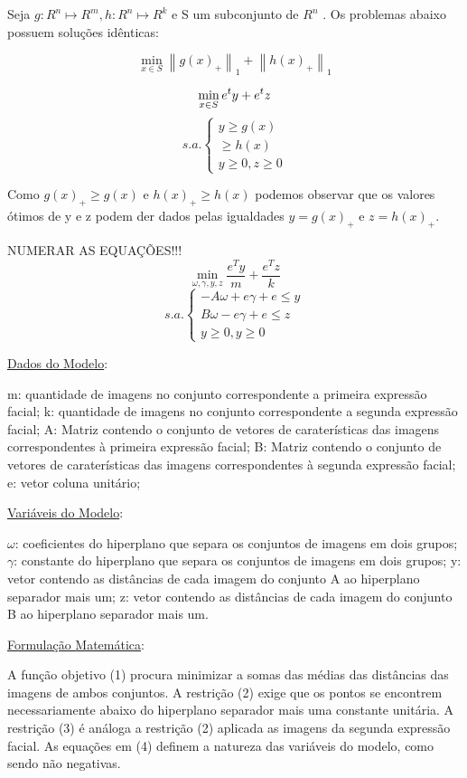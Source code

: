 Seja $g:R^{n} \mapsto R^{m} , h:R^{n} \mapsto R^{k}$ e S um subconjunto de $R^{n}$ . Os problemas abaixo possuem soluções idênticas:

$$\min_{x\in S}\left \| g(x)_{+} \right \|_{1} + \left \| h(x)_{+} \right \|_{1}$$


$$\min_{x\in S} e^{t}y + e^{t}z\\$$
$$ s.a.\left\{\begin{matrix}y\geq g(x)\\ \geq h(x)\\ y\geq 0, z\geq0\end{matrix}\right.$$

Como $g(x)_{+}\geq g(x)$ e $h(x)_{+}\geq h(x)$ podemos observar que os valores ótimos de y e z podem der dados pelas igualdades $y=g(x)_{+}$ e $z=h(x)_{+}$.

NUMERAR AS EQUAÇÕES!!!
$$\min_{\omega ,\gamma ,y,z}\frac{e^{T}y}{m}+\frac{e^{T}z}{k}$$
$$s.a.\left\{\begin{matrix}-A\omega +e\gamma+e\leq y\\B\omega -e\gamma+e\leq  z\\ y\geq 0,y\geq 0\end{matrix}\right.$$

\underline{Dados do Modelo}:

m: quantidade de imagens no conjunto correspondente a primeira expressão facial;
k: quantidade de imagens no conjunto correspondente a segunda expressão facial;
A: Matriz contendo o conjunto de vetores de caraterísticas das imagens correspondentes à primeira expressão facial;
B: Matriz contendo o conjunto de vetores de caraterísticas das imagens correspondentes à segunda expressão facial;
e:  vetor coluna unitário;

\underline{Variáveis do Modelo}:

$\omega$: coeficientes do hiperplano que separa os conjuntos de imagens em dois grupos;
$\gamma$: constante do hiperplano que separa os conjuntos de imagens em dois grupos;
y: vetor contendo as distâncias de cada imagem do conjunto A ao hiperplano separador mais um;
z: vetor contendo as distâncias de cada imagem do conjunto B ao hiperplano separador mais um.

\underline{Formulação Matemática}:

	A função objetivo (1) procura minimizar a somas das médias das distâncias das imagens de ambos conjuntos. A restrição (2) exige que os pontos se encontrem necessariamente abaixo do hiperplano separador mais uma constante unitária.  A restrição (3) é análoga a restrição (2) aplicada as imagens da segunda expressão facial. As equações em (4) definem a natureza das variáveis do modelo, como sendo não negativas.

